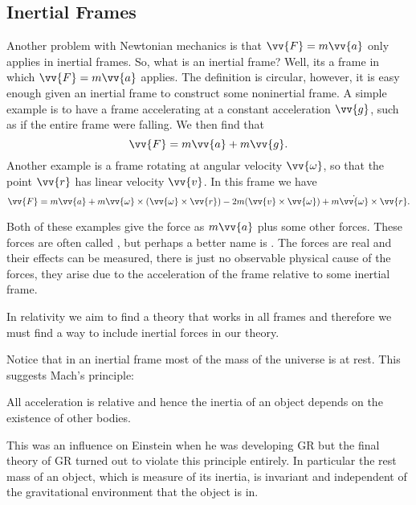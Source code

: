 \documentclass[fleqn]{NotesClass}
\begin{document}
    \subsection{Inertial Frames}
    Another problem with Newtonian mechanics is that \(\vv{F} = m\vv{a}\) only applies in inertial frames.
    So, what is an inertial frame?
    Well, its a frame in which \(\vv{F} = m\vv{a}\) applies.
    The definition is circular, however, it is easy enough given an inertial frame to construct some noninertial frame.
    A simple example is to have a frame accelerating at a constant acceleration \(\vv{g}\), such as if the entire frame were falling.
    We then find that
    \begin{equation}
        \vv{F} = m\vv{a} + m\vv{g}.
    \end{equation}
    Another example is a frame rotating at angular velocity \(\vv{\omega}\), so that the point \(\vv{r}\) has linear velocity \(\vv{v}\).
    In this frame we have
    \begin{equation}
        \vv{F} = m\vv{a} + m\vv{\omega} \times (\vv{\omega} \times \vv{r}) - 2m(\vv{v} \times \vv{\omega}) + m\dot{\vv{\omega}} \times \vv{r}.
    \end{equation}	
    
    Both of these examples give the force as \(m\vv{a}\) plus some other forces.
    These forces are often called , but perhaps a better name is .
    The forces are real and their effects can be measured, there is just no observable physical cause of the forces, they arise due to the acceleration of the frame relative to some inertial frame.
    
    In relativity we aim to find a theory that works in all frames and therefore we must find a way to include inertial forces in our theory.
    
    Notice that in an inertial frame most of the mass of the universe is at rest.
    This suggests Mach's principle:
    \begin{important}
        All acceleration is relative and hence the inertia of an object depends on the existence of other bodies.
    \end{important}
    This was an influence on Einstein when he was developing GR but the final theory of GR turned out to violate this principle entirely.
    In particular the rest mass of an object, which is measure of its inertia, is invariant and independent of the gravitational environment that the object is in.
    
\end{document}
